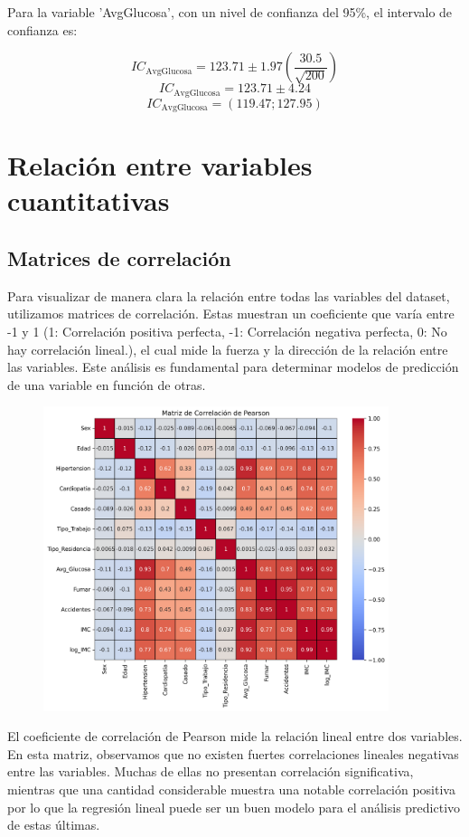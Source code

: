 \documentclass[a4paper, 12pt]{article}
\begin{document}
Para la variable 'AvgGlucosa', con un nivel de confianza del 95\%, el intervalo de confianza es:

\[ IC_{\text{AvgGlucosa}} = 123.71 \pm 1.97 \left( \frac{30.5}{\sqrt{200}} \right) \]
\[ IC_{\text{AvgGlucosa}} = 123.71 \pm 4.24 \]
\[ IC_{\text{AvgGlucosa}} = ( 119.47;  127.95 ) \]


\newpage

\section{Relación entre variables cuantitativas}

\subsection{Matrices de correlación}
Para visualizar de manera clara la relación entre todas las variables del dataset, utilizamos matrices de correlación. Estas muestran un coeficiente que varía entre -1 y 1 (1: Correlación positiva perfecta, -1: Correlación negativa perfecta, 0: No hay correlación lineal.), el cual mide la fuerza y la dirección de la relación entre las variables. Este análisis es fundamental para determinar modelos de predicción de una variable en función de otras.
\begin{figure}[H]
    \centering
    \includegraphics[width=0.9\textwidth]{img/matriz_correlacion_pearson.png}
\end{figure}

El coeficiente de correlación de Pearson mide la relación lineal entre dos variables. En esta matriz, 
observamos que no existen fuertes correlaciones lineales negativas entre las variables. Muchas de ellas 
no presentan correlación significativa, mientras que una cantidad considerable muestra una notable 
correlación positiva por lo que la regresión lineal puede ser un buen modelo para el análisis predictivo de estas últimas.
\end{document}
